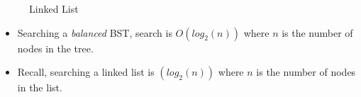 \documentclass{beamer}
\begin{document}
\begin{frame}
\begin{minipage}{0.49\textwidth}
\begin{figure}
{}
            \caption{Linked List}
        \end{figure}
    \end{minipage}
    \vfill
    \scriptsize
    \begin{itemize}
        \item Searching a \textit{balanced} BST, search is $O(log_2(n))$ where $n$ is the number of nodes in the tree.
        \item Recall, searching a linked list is $(log_2(n))$ where $n$ is the number of nodes in the list.
    \end{itemize}

\end{frame}
\end{document}
